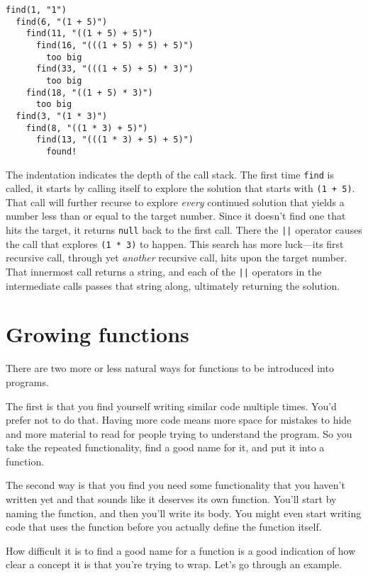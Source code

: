 \begin{lstlisting}
find(1, "1")
  find(6, "(1 + 5)")
    find(11, "((1 + 5) + 5)")
      find(16, "(((1 + 5) + 5) + 5)")
        too big
      find(33, "(((1 + 5) + 5) * 3)")
        too big
    find(18, "((1 + 5) * 3)")
      too big
  find(3, "(1 * 3)")
    find(8, "((1 * 3) + 5)")
      find(13, "(((1 * 3) + 5) + 5)")
        found!
\end{lstlisting}
\noindent

The indentation indicates the depth of the call stack. The first time \lstinline`find` is called, it starts by calling itself to explore the solution that starts with \lstinline`(1 + 5)`. That call will further recurse to explore \emph{every} continued solution that yields a number less than or equal to the target number. Since it doesn't find one that hits the target, it returns \lstinline`null` back to the first call. There the \lstinline`||` operator causes the call that explores \lstinline`(1 * 3)` to happen. This search has more luck—its first recursive call, through yet \emph{another} recursive call, hits upon the target number. That innermost call returns a string, and each of the \lstinline`||` operators in the intermediate calls passes that string along, ultimately returning the solution.

\section{Growing functions}

There are two more or less natural ways for functions to be introduced into programs.

The first is that you find yourself writing similar code multiple times. You'd prefer not to do that. Having more code means more space for mistakes to hide and more material to read for people trying to understand the program. So you take the repeated functionality, find a good name for it, and put it into a function.

The second way is that you find you need some functionality that you haven't written yet and that sounds like it deserves its own function. You'll start by naming the function, and then you'll write its body. You might even start writing code that uses the function before you actually define the function itself.

How difficult it is to find a good name for a function is a good indication of how clear a concept it is that you're trying to wrap. Let's go through an example.

